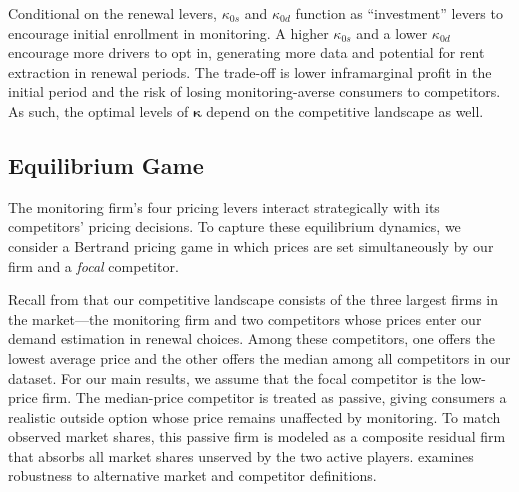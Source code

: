 Conditional on the renewal levers, $\kappa_{0s}$ and $\kappa_{0d}$ function as ``investment'' levers to encourage initial enrollment in monitoring. A higher $\kappa_{0s}$ and a lower $\kappa_{0d}$ encourage more drivers to opt in, generating more data and potential for rent extraction in renewal periods. The trade-off is lower inframarginal profit in the initial period and the risk of losing monitoring-averse consumers to competitors. As such, the optimal levels of $\boldsymbol{\kappa}$ depend on the competitive landscape as well.

\subsection{Equilibrium Game}\label{subsec:equi_concept}

The monitoring firm's four pricing levers interact strategically with its competitors' pricing decisions. To capture these equilibrium dynamics, we consider a Bertrand pricing game in which prices are set simultaneously by our firm and a \textit{focal} competitor.

Recall from  that our competitive landscape consists of the three largest firms in the market---the monitoring firm and two competitors whose prices enter our demand estimation in renewal choices. Among these competitors, one offers the lowest average price and the other offers the median among all competitors in our dataset. For our main results, we assume that the focal competitor is the low-price firm. The median-price competitor is treated as passive, giving consumers a realistic outside option whose price remains unaffected by monitoring. To match observed market shares, this passive firm is modeled as a composite residual firm that absorbs all market shares unserved by the two active players.
 examines robustness to alternative market and competitor definitions.

